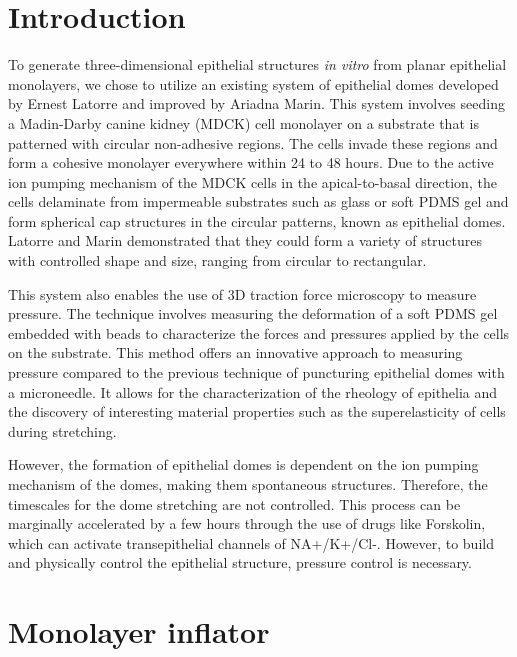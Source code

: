 \hypertarget{introduction}{%
\section{Introduction}\label{introduction1}}


To generate three-dimensional epithelial structures \textit{in vitro} from planar
epithelial monolayers, we chose to utilize an existing system of
epithelial domes developed by Ernest Latorre and improved by Ariadna
Marin. This system involves seeding a Madin-Darby canine kidney (MDCK)
cell monolayer on a substrate that is patterned with circular
non-adhesive regions. The cells invade these regions and form a cohesive
monolayer everywhere within 24 to 48 hours. Due to the active ion
pumping mechanism of the MDCK cells in the apical-to-basal direction,
the cells delaminate from impermeable substrates such as glass or soft
PDMS gel and form spherical cap structures in the circular patterns,
known as epithelial domes. Latorre and Marin demonstrated that they
could form a variety of structures with controlled shape and size,
ranging from circular to rectangular.

This system also enables the use of 3D traction force microscopy to
measure pressure. The technique involves measuring the deformation of a
soft PDMS gel embedded with beads to characterize the forces and
pressures applied by the cells on the substrate. This method offers an
innovative approach to measuring pressure compared to the previous
technique of puncturing epithelial domes with a microneedle. It allows
for the characterization of the rheology of epithelia and the discovery
of interesting material properties such as the superelasticity of cells
during stretching.

However, the formation of epithelial domes is dependent on the ion
pumping mechanism of the domes, making them spontaneous structures.
Therefore, the timescales for the dome stretching are not controlled.
This process can be marginally accelerated by a few hours through the
use of drugs like Forskolin, which can activate transepithelial channels
of NA+/K+/Cl-. However, to build and physically control the epithelial
structure, pressure control is necessary.

\hypertarget{monolayer-inflator}{%
\section{Monolayer inflator}\label{monolayer-inflator}}

